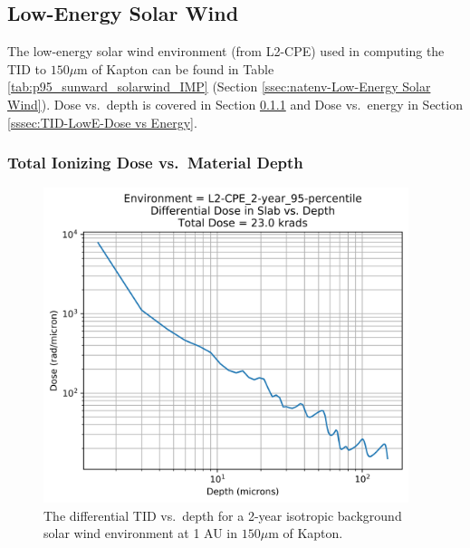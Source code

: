 \documentclass{hitec}
\begin{document}
\clearpage %

\subsection{Low-Energy Solar Wind}
\label{ssec:TID-Low-Energy Solar Wind}

The low-energy solar wind environment (from L2-CPE) used in computing the TID to $150 \mu$m of Kapton can be found in Table \ref{tab:p95_sunward_solarwind_IMP} (Section \ref{ssec:natenv-Low-Energy Solar Wind}).  Dose vs.\ depth is covered in Section \ref{sssec:TID-LowE-Dose vs Depth} and Dose vs.\ energy in Section \ref{sssec:TID-LowE-Dose vs Energy}.

\subsubsection{Total Ionizing Dose vs.\ Material Depth}
\label{sssec:TID-LowE-Dose vs Depth}

\begin{figure}[htbp!]
	\centering
	\includegraphics[width=0.95\textwidth]{../L2-CPE_2-year_95-percentile_Differential_Dose_vs_Depth.png}
	\caption{The differential TID vs.\ depth for a 2-year isotropic background solar wind environment at 1 AU in $150 \mu$m of Kapton.}\label{fig:L2-CPE_2-year_95-percentile_Differential_Dose_vs_Depth}
\end{figure}
\end{document}
